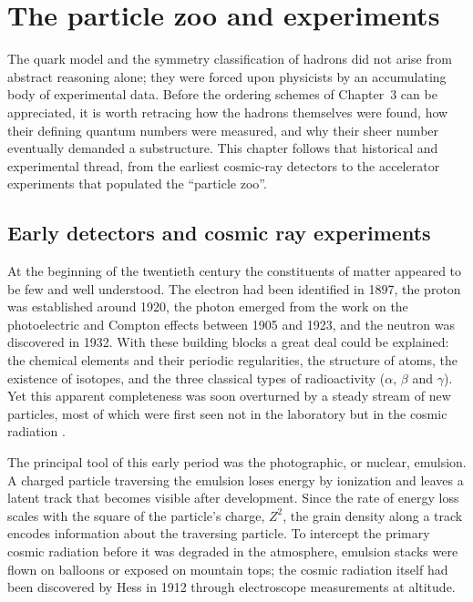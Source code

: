 \section{The particle zoo and experiments}
\label{sec:particle-zoo}

The quark model and the symmetry classification of hadrons did not arise from
abstract reasoning alone; they were forced upon physicists by an accumulating body
of experimental data. Before the ordering schemes of Chapter~3 can be appreciated,
it is worth retracing how the hadrons themselves were found, how their defining
quantum numbers were measured, and why their sheer number eventually demanded a
substructure. This chapter follows that historical and experimental thread, from the
earliest cosmic-ray detectors to the accelerator experiments that populated the
``particle zoo''.

\subsection{Early detectors and cosmic ray experiments}
\label{subsec:early-detectors}

At the beginning of the twentieth century the constituents of matter appeared to be
few and well understood. The electron had been identified in 1897, the proton was
established around 1920, the photon emerged from the work on the photoelectric and
Compton effects between 1905 and 1923, and the neutron was discovered in 1932.
With these building blocks a great deal could be explained: the chemical elements
and their periodic regularities, the structure of atoms, the existence of isotopes,
and the three classical types of radioactivity ($\alpha$, $\beta$ and $\gamma$).
Yet this apparent completeness was soon overturned by a steady stream of new
particles, most of which were first seen not in the laboratory but in the cosmic
radiation \cite[Ch.~2]{Amsler2018}.

The principal tool of this early period was the photographic, or nuclear, emulsion.
A charged particle traversing the emulsion loses energy by ionization and leaves a
latent track that becomes visible after development. Since the rate of energy loss
scales with the square of the particle's charge, $Z^2$, the grain density along a
track encodes information about the traversing particle. To intercept the primary
cosmic radiation before it was degraded in the atmosphere, emulsion stacks were
flown on balloons or exposed on mountain tops; the cosmic radiation itself had been
discovered by Hess in 1912 through electroscope measurements at altitude.

